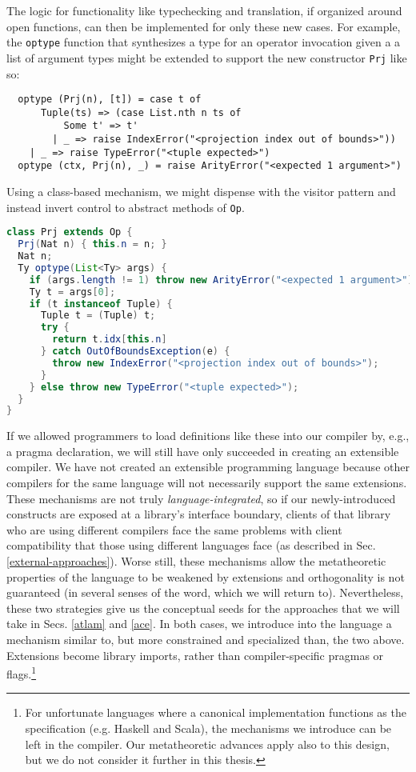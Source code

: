 The logic for functionality like typechecking and translation, if organized around open functions, can then be implemented for only these new cases. For example, the \verb|optype| function that synthesizes a type for an operator invocation given a  a list of argument types might be extended to support the new constructor \verb|Prj| like so:
\begin{lstlisting}
  optype (Prj(n), [t]) = case t of 
      Tuple(ts) => (case List.nth n ts of 
          Some t' => t'
        | _ => raise IndexError("<projection index out of bounds>"))
    | _ => raise TypeError("<tuple expected>")
  optype (ctx, Prj(n), _) = raise ArityError("<expected 1 argument>")
\end{lstlisting}

Using a class-based mechanism, we might dispense with the visitor pattern and instead invert control to abstract methods of \verb|Op|. 

\begin{lstlisting}[language=Java]
class Prj extends Op {
  Prj(Nat n) { this.n = n; }
  Nat n;
  Ty optype(List<Ty> args) {
    if (args.length != 1) throw new ArityError("<expected 1 argument>")
    Ty t = args[0];
    if (t instanceof Tuple) {
      Tuple t = (Tuple) t;
      try {
        return t.idx[this.n]
      } catch OutOfBoundsException(e) {
        throw new IndexError("<projection index out of bounds>");
      }
    } else throw new TypeError("<tuple expected>");
  }
}
\end{lstlisting} 

If we allowed programmers to load definitions like these into our compiler by, e.g., a pragma declaration, we will still have only succeeded in creating an extensible compiler. We have not created an extensible programming language because other compilers for the same language will not necessarily support the same extensions. These mechanisms are not truly \emph{language-integrated}, so if our newly-introduced constructs are exposed at a library's  interface boundary, clients of that library who are using different compilers face the same problems with client compatibility that those using different languages face (as described in Sec. \ref{external-approaches}). Worse still, these mechanisms allow the  metatheoretic properties of the language to be weakened by extensions and orthogonality is not guaranteed (in several senses of the word, which we will return to). %
Nevertheless, these two strategies give us the conceptual seeds for the approaches that we will take in Secs. \ref{atlam} and \ref{ace}. 
In both cases, we introduce into the language a mechanism similar to, but more constrained and specialized  than, the two above. Extensions become library imports, rather than compiler-specific pragmas or flags.\footnote{For unfortunate languages where a canonical implementation functions as the specification (e.g. Haskell and Scala), the mechanisms we introduce can be left in the compiler. Our metatheoretic advances apply also to this design, but we do not consider it further in this thesis.}



